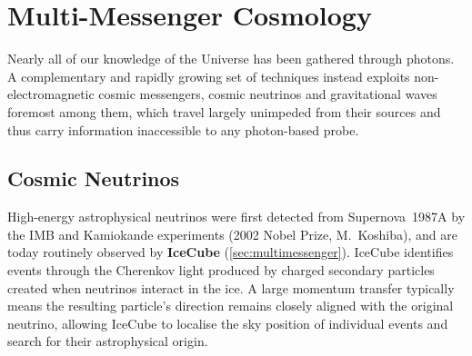 





\section{Multi-Messenger Cosmology} \label{sec:mm_probes}

Nearly all of our knowledge of the Universe has been gathered through photons. A complementary and rapidly growing set of techniques instead exploits non-electromagnetic cosmic messengers, cosmic neutrinos and gravitational waves foremost among them, which travel largely unimpeded from their sources and thus carry information inaccessible to any photon-based probe.

\subsection{Cosmic Neutrinos} \label{subsec:cosmic_neutrinos_probe}

High-energy astrophysical neutrinos were first detected from Supernova~1987A by the IMB and Kamiokande experiments (2002 Nobel Prize, M.\ Koshiba), and are today routinely observed by \textbf{IceCube} (\cref{sec:multimessenger}). IceCube identifies events through the Cherenkov light produced by charged secondary particles created when neutrinos interact in the ice. A large momentum transfer typically means the resulting particle's direction remains closely aligned with the original neutrino, allowing IceCube to localise the sky position of individual events and search for their astrophysical origin.

